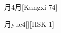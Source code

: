 \begin{entry}{月}{4}{⽉}[Kangxi 74]
  \begin{phonetics}{月}{yue4}[][HSK 1]
  \end{phonetics}
\end{entry}
